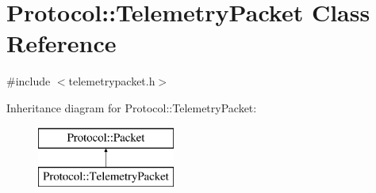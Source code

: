 \hypertarget{class_protocol_1_1_telemetry_packet}{}\section{Protocol\+:\+:Telemetry\+Packet Class Reference}
\label{class_protocol_1_1_telemetry_packet}


{\ttfamily \#include $<$telemetrypacket.\+h$>$}

Inheritance diagram for Protocol\+:\+:Telemetry\+Packet\+:\begin{figure}[H]
\begin{center}
\leavevmode
\includegraphics[height=2.000000cm]{class_protocol_1_1_telemetry_packet}
\end{center}
\end{figure}

